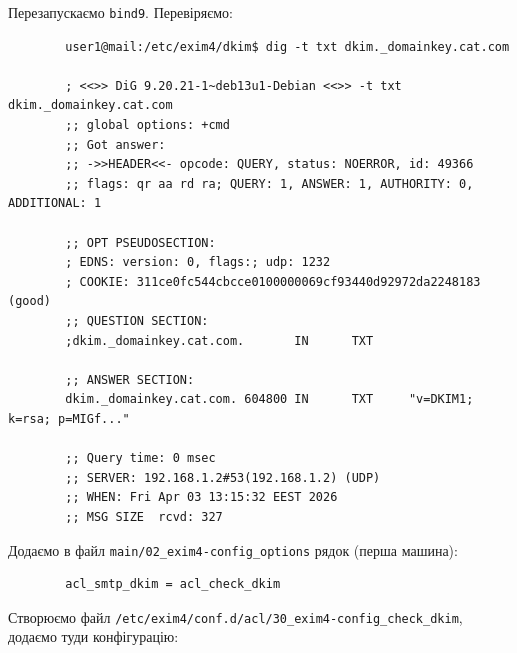 \documentclass[14pt, a4paper]{extreport}
\begin{document}
	Перезапускаємо \texttt{bind9}. Перевіряємо:
	
	\begin{verbatim}
		user1@mail:/etc/exim4/dkim$ dig -t txt dkim._domainkey.cat.com
		
		; <<>> DiG 9.20.21-1~deb13u1-Debian <<>> -t txt dkim._domainkey.cat.com
		;; global options: +cmd
		;; Got answer:
		;; ->>HEADER<<- opcode: QUERY, status: NOERROR, id: 49366
		;; flags: qr aa rd ra; QUERY: 1, ANSWER: 1, AUTHORITY: 0, ADDITIONAL: 1
		
		;; OPT PSEUDOSECTION:
		; EDNS: version: 0, flags:; udp: 1232
		; COOKIE: 311ce0fc544cbcce0100000069cf93440d92972da2248183 (good)
		;; QUESTION SECTION:
		;dkim._domainkey.cat.com.       IN      TXT
		
		;; ANSWER SECTION:
		dkim._domainkey.cat.com. 604800 IN      TXT     "v=DKIM1; k=rsa; p=MIGf..."
		
		;; Query time: 0 msec
		;; SERVER: 192.168.1.2#53(192.168.1.2) (UDP)
		;; WHEN: Fri Apr 03 13:15:32 EEST 2026
		;; MSG SIZE  rcvd: 327
	\end{verbatim}
	
	Додаємо в файл \texttt{main/02\_exim4-config\_options} рядок (перша машина):
	
	\begin{verbatim}
		acl_smtp_dkim = acl_check_dkim
	\end{verbatim}
	
	Створюємо файл \texttt{/etc/exim4/conf.d/acl/30\_exim4-config\_check\_dkim}, додаємо туди конфігурацію:
	
\end{document}

